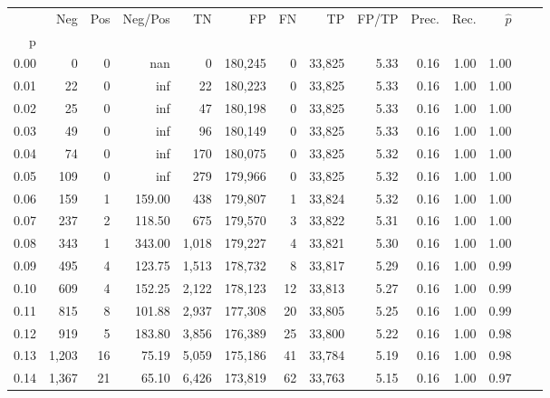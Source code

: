 \begin{tabular}{rrrrrrrrrrrrrr}
\toprule
{} &    Neg &  Pos & Neg/Pos &       TN &       FP &      FN &      TP & FP/TP & Prec. &  Rec. & $\hat{p}$ \\
p    &        &      &         &          &          &         &         &       &       &       &           \\
\midrule
0.00 &      0 &    0 &     nan &        0 &  180,245 &       0 &  33,825 &  5.33 &  0.16 &  1.00 &      1.00 \\
0.01 &     22 &    0 &     inf &       22 &  180,223 &       0 &  33,825 &  5.33 &  0.16 &  1.00 &      1.00 \\
0.02 &     25 &    0 &     inf &       47 &  180,198 &       0 &  33,825 &  5.33 &  0.16 &  1.00 &      1.00 \\
0.03 &     49 &    0 &     inf &       96 &  180,149 &       0 &  33,825 &  5.33 &  0.16 &  1.00 &      1.00 \\
0.04 &     74 &    0 &     inf &      170 &  180,075 &       0 &  33,825 &  5.32 &  0.16 &  1.00 &      1.00 \\
0.05 &    109 &    0 &     inf &      279 &  179,966 &       0 &  33,825 &  5.32 &  0.16 &  1.00 &      1.00 \\
0.06 &    159 &    1 &  159.00 &      438 &  179,807 &       1 &  33,824 &  5.32 &  0.16 &  1.00 &      1.00 \\
0.07 &    237 &    2 &  118.50 &      675 &  179,570 &       3 &  33,822 &  5.31 &  0.16 &  1.00 &      1.00 \\
0.08 &    343 &    1 &  343.00 &    1,018 &  179,227 &       4 &  33,821 &  5.30 &  0.16 &  1.00 &      1.00 \\
0.09 &    495 &    4 &  123.75 &    1,513 &  178,732 &       8 &  33,817 &  5.29 &  0.16 &  1.00 &      0.99 \\
0.10 &    609 &    4 &  152.25 &    2,122 &  178,123 &      12 &  33,813 &  5.27 &  0.16 &  1.00 &      0.99 \\
0.11 &    815 &    8 &  101.88 &    2,937 &  177,308 &      20 &  33,805 &  5.25 &  0.16 &  1.00 &      0.99 \\
0.12 &    919 &    5 &  183.80 &    3,856 &  176,389 &      25 &  33,800 &  5.22 &  0.16 &  1.00 &      0.98 \\
0.13 &  1,203 &   16 &   75.19 &    5,059 &  175,186 &      41 &  33,784 &  5.19 &  0.16 &  1.00 &      0.98 \\
0.14 &  1,367 &   21 &   65.10 &    6,426 &  173,819 &      62 &  33,763 &  5.15 &  0.16 &  1.00 &      0.97 \\

\end{tabular}
